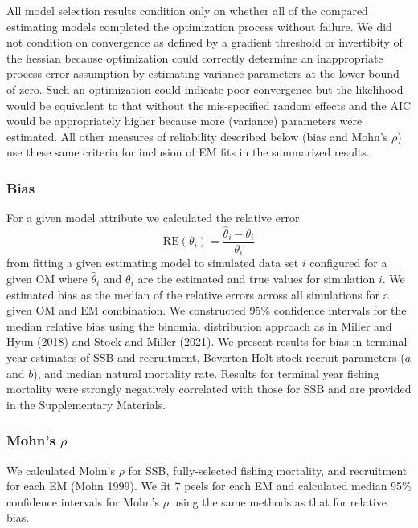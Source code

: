 \documentclass[
  12pt,
]{article}
\begin{document}
All model selection results condition only on whether all of the
compared estimating models completed the optimization process without
failure. We did not condition on convergence as defined by a gradient
threshold or invertibity of the hessian because optimization could
correctly determine an inappropriate process error assumption by
estimating variance parameters at the lower bound of zero. Such an
optimization could indicate poor convergence but the likelihood would be
equivalent to that without the mis-specified random effects and the AIC
would be appropriately higher because more (variance) parameters were
estimated. All other measures of reliability described below (bias and
Mohn's \(\rho\)) use these same criteria for inclusion of EM fits in the
summarized results.

\hypertarget{bias}{%
\subsubsection*{Bias}\label{bias}}

For a given model attribute we calculated the relative error \[
\text{RE}\left(\theta_i\right) = \frac{\widehat \theta_i - \theta_i}{\theta_i}
\] from fitting a given estimating model to simulated data set \(i\)
configured for a given OM where \(\widehat \theta_i\) and \(\theta_i\)
are the estimated and true values for simulation \(i\). We estimated
bias as the median of the relative errors across all simulations for a
given OM and EM combination. We constructed 95\% confidence intervals
for the median relative bias using the binomial distribution approach as
in Miller and Hyun (2018) and Stock and Miller (2021). We present
results for bias in terminal year estimates of SSB and recruitment,
Beverton-Holt stock recruit parameters (\(a\) and \(b\)), and median
natural mortality rate. Results for terminal year fishing mortality were
strongly negatively correlated with those for SSB and are provided in
the Supplementary Materials.

\hypertarget{mohns-rho}{%
\subsubsection*{\texorpdfstring{Mohn's
\(\rho\)}{Mohn's \textbackslash rho}}\label{mohns-rho}}

We calculated Mohn's \(\rho\) for SSB, fully-selected fishing mortality,
and recruitment for each EM (Mohn 1999). We fit 7 peels for each EM and
calculated median 95\% confidence intervals for Mohn's \(\rho\) using
the same methods as that for relative bias.
\end{document}
